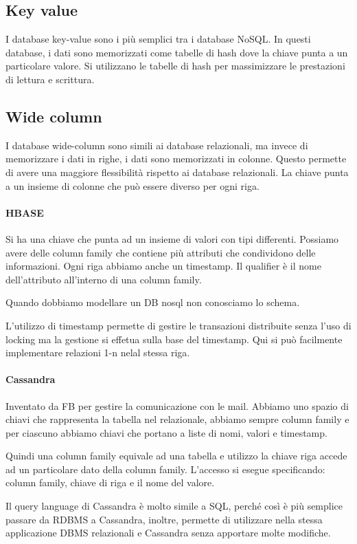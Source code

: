 \subsection{Key value}
I database key-value sono i più semplici tra i database NoSQL. In questi
database, i dati sono memorizzati come tabelle di hash dove la chiave punta a un
particolare valore. Si utilizzano le tabelle di hash per massimizzare le prestazioni
di lettura e scrittura.
\subsection{Wide column}
I database wide-column sono simili ai database relazionali, ma invece di
memorizzare i dati in righe, i dati sono memorizzati in colonne. Questo permette
di avere una maggiore flessibilità rispetto ai database relazionali. La chiave
punta a un insieme di colonne che può essere diverso per ogni riga.

\paragraph{HBASE}
Si ha una chiave che punta ad un insieme di valori con tipi differenti. Possiamo 
avere delle column family che contiene più attributi che condividono delle informazioni.
Ogni riga abbiamo anche un timestamp. Il qualifier è il nome
dell'attributo all'interno di una column family.

Quando dobbiamo modellare un DB nosql non conosciamo lo schema.

L'utilizzo di timestamp permette di gestire le transazioni distribuite senza l'uso
di locking ma la gestione si effetua sulla base del timestamp. Qui si può facilmente
implementare relazioni 1-n nelal stessa riga.
\paragraph{Cassandra}
Inventato da FB per gestire la comunicazione con le mail.
Abbiamo uno spazio di chiavi che rappresenta la tabella nel relazionale, 
abbiamo sempre column family e per ciascuno abbiamo chiavi che portano a 
liste di nomi, valori e timestamp.

Quindi una column family equivale ad una tabella e utilizzo la chiave riga 
accede ad un particolare dato della column family.
L'accesso si esegue specificando: column family, chiave di riga e il nome del valore.

Il query language di Cassandra è molto simile a SQL, perché così è più semplice 
passare da RDBMS a Cassandra, inoltre, permette di utilizzare nella stessa applicazione 
DBMS relazionali e Cassandra senza apportare molte modifiche.

